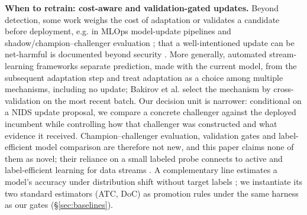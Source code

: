 \documentclass[journal]{IEEEtran}
\begin{document}
\textbf{When to retrain: cost-aware and validation-gated updates.} Beyond detection, some work weighs the cost of adaptation or validates a candidate before deployment, e.g. in MLOps model-update pipelines and shadow/champion--challenger evaluation \cite{nath2007champion,sculley2015hidden,kreuzberger2023mlops,guissouma2023continuous}; that a well-intentioned update can be net-harmful is documented beyond security \cite{bansal2019updates}. More generally, automated stream-learning frameworks separate prediction, made with the current model, from the subsequent adaptation step and treat adaptation as a choice among multiple mechanisms, including no update; Bakirov et al. \cite{bakirov2021automated} select the mechanism by cross-validation on the most recent batch. Our decision unit is narrower: conditional on a NIDS update proposal, we compare a concrete challenger against the deployed incumbent while controlling how that challenger was constructed and what evidence it received. Champion--challenger evaluation, validation gates and label-efficient model comparison are therefore not new, and this paper claims none of them as novel; their reliance on a small labeled probe connects to active and label-efficient learning for data streams \cite{cacciarelli2024active,krawczyk2019adaptive,liu2021comprehensive}. A complementary line estimates a model's accuracy under distribution shift without target labels \cite{garg2022atc,guillory2021doc,deng2021labels,baek2022agreement,jiang2022disagreement,rosenfeld2023dis2}; we instantiate its two standard estimators (ATC, DoC) as promotion rules under the same harness as our gates (\S\ref{sec:baselines}).
\end{document}
